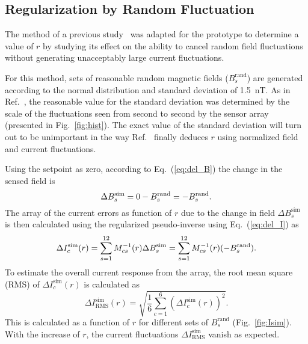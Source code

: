 \subsection{Regularization by Random Fluctuation}\label{sec:mont}

The method of a previous study~\cite{bea} was adapted for the prototype to determine a value of $r$ by studying its effect on the ability to cancel random field fluctuations without generating unacceptably large current fluctuations.

For this method, sets of reasonable random magnetic fields ($B_s^{\text{rand}}$) are generated according to the normal distribution and standard deviation of 1.5~nT. As in Ref.~\cite{bea}, the reasonable value for the standard deviation was determined by the scale of the fluctuations seen from second to second by the sensor array (presented in Fig.~\ref{fig:hist}). The exact value of the standard deviation will turn out to be unimportant in the way Ref.~\cite{bea} finally deduces $r$ using normalized field and current fluctuations.

Using the setpoint as zero, according to Eq.~(\ref{eq:del_B}) the change in the sensed field is  
\begin{equation}\label{eq:del_Bs}
    \Delta B_s^{\text{sim}} = 0 - B_s^{\text{rand}}=-B_s^{\text{rand}}{\rm .}
\end{equation}
The array of the current errors  as function of $r$ due to the change in field $\Delta B_s^{\text{sim}}$ is then calculated using the regularized pseudo-inverse using Eq.~(\ref{eq:del_I}) as
\begin{equation}\label{eq:del_Is}
    \Delta I_c^{\text{sim}}(r) =\sum_{s=1}^{12} M^{-1}_{cs}(r) \Delta B_s^{\text{sim}}=\sum_{s=1}^{12} M^{-1}_{cs}(r) (-B_s^{\text{rand}}){\rm .}
\end{equation}
To estimate the overall current response from the array, the root mean square (RMS) of $\Delta I_c^{\text{sim}}(r)$ is calculated as
\begin{equation}\label{eq:delta_Isim_rms}
     \Delta I_{\text{RMS}}^{\text{sim}}(r)= \sqrt{\frac{1}{6}\sum_{c=1}^6 (\Delta I_c^{\text{sim}}(r))^2}\text{.}
\end{equation}
This is calculated as a function of $r$ for different sets of $B_s^{\text{rand}}$ (Fig.~\ref{fig:Isim}). With the increase of $r$, the current fluctuations $\Delta I_{\text{RMS}}^{\text{sim}}$ vanish as expected.



